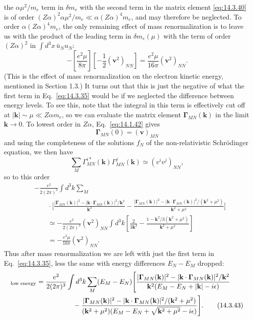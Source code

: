 the $\alpha\mu^2/m_e$ term in $\delta m_e$ with the second term in the matrix
element \eqref{eq:14.3.40} is of order
$(Z\alpha)^2\alpha\mu^2/m_e\ll\alpha(Z\alpha)^4m_e$, and may therefore be
neglected. To order $\alpha(Z\alpha)^4m_e$, the only remaining effect of mass
renormalization is to leave us with the product of the leading term in
$\delta m_e(\mu)$ with the term of order $(Z\alpha)^2$ in
$\int d^3x\,\bar u_Nu_N$:
\[
-\left[\frac{e^2\mu}{8\pi}\right]
\left[-\frac12(\mathbf v^2)_{NN}\right]
=\frac{e^2\mu}{16\pi}(\mathbf v^2)_{NN}.
\]
(This is the effect of mass renormalization on the electron kinetic energy,
mentioned in Section 1.3.) It turns out that this is just the negative of what
the first term in Eq.~\eqref{eq:14.3.35} would be if we neglected the
difference between energy levels. To see this, note that the integral in this
term is effectively cut off at $|\mathbf k|\sim\mu\ll Z\alpha m_e$, so we can
evaluate the matrix element $\boldsymbol\Gamma_{MN}(\mathbf k)$ in the limit
$\mathbf k\to0$. To lowest order in $Z\alpha$, Eq.~\eqref{eq:14.1.42} gives
\begin{equation}
\boldsymbol\Gamma_{MN}(0)=(\mathbf v)_{MN}
\tag{14.3.41}\label{eq:14.3.41}
\end{equation}
and using the completeness of the solutions $f_N$ of the non-relativistic
Schrödinger equation, we then have
\begin{equation}
\sum_M\Gamma_{MN}^{i*}(\mathbf k)\Gamma_{MN}^j(\mathbf k)
\simeq(v^iv^j)_{NN},
\tag{14.3.42}\label{eq:14.3.42}
\end{equation}
so to this order
\begin{align*}
&-\frac{e^2}{2(2\pi)^3}\int d^3k\sum_M\\
&\qquad\cdot\Biggl[
\frac{|\boldsymbol\Gamma_{MN}(\mathbf k)|^2
-|\mathbf k\cdot\boldsymbol\Gamma_{MN}(\mathbf k)|^2/\mathbf k^2}
{\mathbf k^2}
-\frac{|\boldsymbol\Gamma_{MN}(\mathbf k)|^2
-|\mathbf k\cdot\boldsymbol\Gamma_{MN}(\mathbf k)|^2/(\mathbf k^2+\mu^2)}
{\mathbf k^2+\mu^2}\Biggr]\\
&\qquad\simeq-\frac{e^2}{2(2\pi)^3}(\mathbf v^2)_{NN}
\int d^3k\left[\frac{2}{3\mathbf k^2}
-\frac{1-\mathbf k^2/3(\mathbf k^2+\mu^2)}{\mathbf k^2+\mu^2}\right]\\
&\qquad=-\frac{e^2\mu}{16\pi}(\mathbf v^2)_{NN}.
\end{align*}
Thus after mass renormalization we are left with just the first term in
Eq.~\eqref{eq:14.3.35}, less the same with energy differences $E_N-E_M$
dropped:
\begin{align}
[\delta E_N]_{\text{low energy}}={}&
\frac{e^2}{2(2\pi)^3}\int d^3k\sum_M(E_M-E_N)
\Biggl[\frac{|\boldsymbol\Gamma_{MN}(\mathbf k)|^2
-|\mathbf k\cdot\boldsymbol\Gamma_{MN}(\mathbf k)|^2/\mathbf k^2}
{\mathbf k^2(E_M-E_N+|\mathbf k|-i\epsilon)}\notag\\
&\hspace{14mm}-
\frac{|\boldsymbol\Gamma_{MN}(\mathbf k)|^2
-|\mathbf k\cdot\boldsymbol\Gamma_{MN}(\mathbf k)|^2/(\mathbf k^2+\mu^2)}
{(\mathbf k^2+\mu^2)(E_M-E_N+\sqrt{\mathbf k^2+\mu^2}-i\epsilon)}
\Biggr].
\tag{14.3.43}\label{eq:14.3.43}
\end{align}
